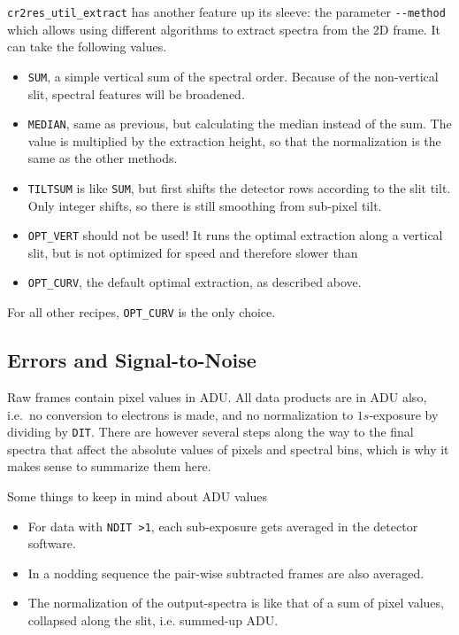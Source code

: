 \verb!cr2res_util_extract! has another feature up its sleeve: the parameter
\verb!--method! which allows using different algorithms to extract spectra from
the 2D frame. It can take the following values.
\begin{itemize}
    \item \verb!SUM!, a simple vertical sum of the spectral order. Because of
    the non-vertical slit, spectral features will be broadened.
    \item \verb!MEDIAN!, same as previous, but calculating the median instead of
    the sum. The value is multiplied by the extraction height, so that the
    normalization is the same as the other methods.
    \item \verb!TILTSUM! is like \verb!SUM!, but first shifts the detector rows
    according to the slit tilt. Only integer shifts, so there is still smoothing
    from sub-pixel tilt.
    \item \verb!OPT_VERT! should not be used! It runs the optimal extraction
    along a vertical slit, but is not optimized for speed and therefore slower
    than
    \item \verb!OPT_CURV!, the default optimal extraction, as described above.
\end{itemize}

For all other recipes, \verb!OPT_CURV! is the only choice.

\subsection{Errors and Signal-to-Noise}
\label{sec:errors}

Raw frames contain pixel values in ADU. All data products are in ADU also,
i.e.~no conversion to electrons is made, and no normalization to $1s$-exposure by
dividing by \verb!DIT!. There are however several steps along the way to the
final spectra that affect the absolute values of pixels and spectral bins, which
is why it makes sense to summarize them here.

Some things to keep in mind about ADU values
\begin{itemize}
    \item For data with \verb!NDIT >1!, each sub-exposure gets averaged in the
    detector software.
    \item In a nodding sequence the pair-wise subtracted frames are also
    averaged.
    \item The normalization of the output-spectra is like that of a sum of pixel
    values, collapsed along the slit, i.e. summed-up ADU.
\end{itemize}


